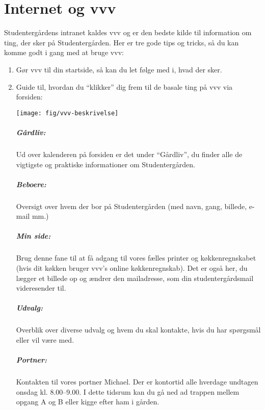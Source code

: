 \documentclass[11pt,article,twoside,openany,danish,extrafontsizes]{memoir} %
\begin{document}
\chapter{Internet og vvv}
\label{chap:vvv}
Studentergårdens intranet kaldes vvv og er den bedste kilde til information om ting, der sker på Studentergården. Her er tre gode tips og tricks, så du kan komme godt i gang med at bruge vvv:
\begin{enumerate}
	\item Gør vvv til din startside, så kan du let følge med i, hvad der sker.
	\item Guide til, hvordan du \enquote{klikker} dig frem til de basale ting på vvv via forsiden:

	\texttt{[image: fig/vvv-beskrivelse]}


		\paragraph{Gårdliv:} Ud over kalenderen på forsiden er det under \enquote{Gårdliv}, du finder alle de vigtigste og praktiske informationer om Studentergården.

		\paragraph{Beboere:} Oversigt over hvem der bor på Studentergården (med navn, gang, billede, e-mail mm.)

		\paragraph{Min side:} Brug denne fane til at få adgang til vores fælles printer og køkkenregnskabet (hvis dit køkken bruger vvv’s online køkkenregnskab). Det er også her, du lægger et billede op og ændrer den mailadresse, som din studentergårdsmail videresender til.

		\paragraph{Udvalg:} Overblik over diverse udvalg og hvem du skal kontakte, hvis du har spørgsmål eller vil være med.

		\paragraph{Portner:} Kontakten til vores portner Michael. Der er kontortid alle hverdage undtagen onsdag kl. 8.00–9.00. I dette tidsrum kan du gå ned ad trappen mellem opgang A og B eller kigge efter ham i gården.


\end{enumerate}
\end{document}
